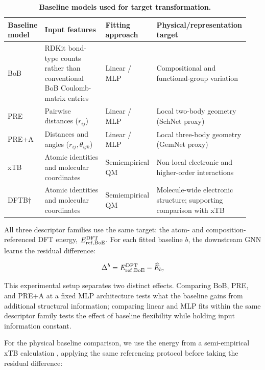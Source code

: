 \begin{table}[H]
  \centering
  \caption{\textbf{Baseline models used for target transformation.}}
  \label{tab:baseline-models}
  \small
  \setlength{\tabcolsep}{4pt}
  \renewcommand{\arraystretch}{1.2}
  \begin{tabular}{@{}>{\raggedright\arraybackslash}p{0.12\linewidth}>{\raggedright\arraybackslash}p{0.25\linewidth}>{\raggedright\arraybackslash}p{0.19\linewidth}>{\raggedright\arraybackslash}p{0.38\linewidth}@{}}
    \toprule
    Baseline model & Input features & Fitting approach & Physical/representation target \\
    \midrule
    BoB & RDKit bond-type counts rather than conventional BoB Coulomb-matrix entries & Linear / MLP & Compositional and functional-group variation \\
    PRE & Pairwise distances (\(r_{ij}\)) & Linear / MLP & Local two-body geometry (SchNet proxy) \\
    PRE+A & Distances and angles (\(r_{ij},\theta_{ijk}\)) & Linear / MLP & Local three-body geometry (GemNet proxy) \\
    xTB & Atomic identities and molecular coordinates & Semiempirical QM & Non-local electronic and higher-order interactions \\
    DFTB\(\dagger\) & Atomic identities and molecular coordinates & Semiempirical QM & Molecule-wide electronic structure; supporting comparison with xTB \\
    \bottomrule
  \end{tabular}
\end{table}

All three descriptor families use the same target: the atom- and composition-referenced DFT energy, $E_{\rm ref,BoE}^{\rm DFT}$. For each fitted baseline $b$, the downstream GNN learns the residual difference:

\begin{equation}
\Delta^b=E_{\rm ref,BoE}^{\rm DFT}-\widehat{E}_b,
\label{eq:descriptor-delta}
\end{equation}

This experimental setup separates two distinct effects. Comparing BoB, PRE, and PRE+A at a fixed MLP architecture tests what the baseline gains from additional structural information; comparing linear and MLP fits within the same descriptor family tests the effect of baseline flexibility while holding input information constant.

For the physical baseline comparison, we use the energy from a semi-empirical xTB calculation \cite{bannwarth2019gfn2xtb}, applying the same referencing protocol before taking the residual difference:


